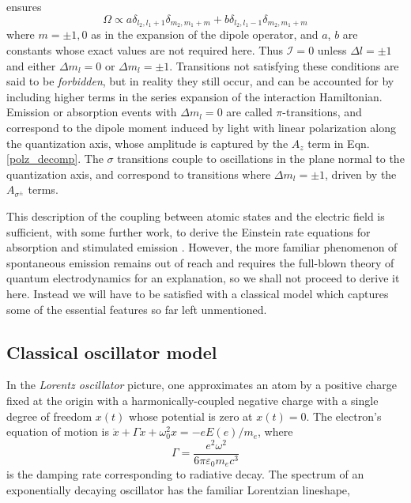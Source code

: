 	 ensures
	\begin{equation}
		\Omega\propto a\delta_{l_2,l_1+1}\delta_{m_2,m_1+m} + b\delta_{l_2,l_1-1}\delta_{m_2,m_1+m}
	\end{equation}
	where $m=\pm1,0$ as in the expansion of the dipole operator, and $a$, $b$ are constants whose exact values are not required here. Thus $\mathcal{I}=0$ unless $\Delta l=\pm1$ and either $\Delta m_l=0$ or $\Delta m_l=\pm1$. Transitions not satisfying these conditions are said to be \emph{forbidden}, but in reality they still occur, and can be accounted for by including higher terms in the series expansion of the interaction Hamiltonian. Emission or absorption events with $\Delta m_l=0$ are called $\pi$-transitions, and correspond to the dipole moment induced by light with linear polarization along the quantization axis, whose amplitude is captured by the $A_z$ term in Eqn. \ref{polz_decomp}. The $\sigma$ transitions couple to oscillations in the plane normal to the quantization axis, and correspond to transitions where $\Delta m_l=\pm 1$, driven by the $A_{\sigma^\pm}$ terms. 


	This description of the coupling between atomic states and the electric field is sufficient, with some further work, to derive the Einstein rate equations for absorption and stimulated emission \cite{FootAtomic}. However, the more familiar phenomenon of spontaneous emission remains out of reach and requires the full-blown theory of quantum electrodynamics for an explanation, so we shall not proceed to derive it here. Instead we will have to be satisfied with a classical model which captures some of the essential features so far left unmentioned.



	\subsection*{Classical oscillator model}

	In the \emph{Lorentz oscillator} picture, one approximates an atom by a positive charge fixed at the origin with a harmonically-coupled negative charge with a single degree of freedom $x(t)$ whose potential is zero at $x(t)=0$. The electron's equation of motion is $\ddot{x} + \Gamma\dot{x} + \omega_0^2x = -e E(e)/m_e$, where
	\begin{equation}
		\Gamma = \frac{e^2\omega^2}{6\pi \varepsilon_0 m_e c^3}
	\end{equation}
	is the damping rate corresponding to radiative decay. The spectrum of an exponentially decaying oscillator has the familiar Lorentzian lineshape,

